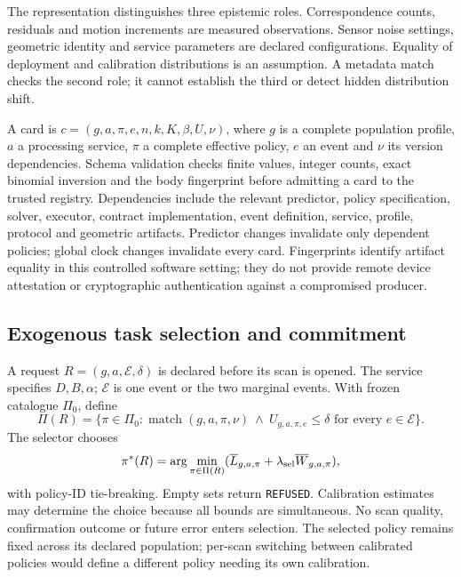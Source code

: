 The representation distinguishes three epistemic roles. Correspondence counts, residuals and motion increments are measured observations. Sensor noise settings, geometric identity and service parameters are declared configurations. Equality of deployment and calibration distributions is an assumption. A metadata match checks the second role; it cannot establish the third or detect hidden distribution shift.

A card is $c=(g,a,\pi,e,n,k,K,\beta,U,\nu)$, where $g$ is a complete population profile, $a$ a processing service, $\pi$ a complete effective policy, $e$ an event and $\nu$ its version dependencies. Schema validation checks finite values, integer counts, exact binomial inversion and the body fingerprint before admitting a card to the trusted registry. Dependencies include the relevant predictor, policy specification, solver, executor, contract implementation, event definition, service, profile, protocol and geometric artifacts. Predictor changes invalidate only dependent policies; global clock changes invalidate every card. Fingerprints identify artifact equality in this controlled software setting; they do not provide remote device attestation or cryptographic authentication against a compromised producer.

\subsection{Exogenous task selection and commitment}\label{sec:dispatch}
A request $R=(g,a,\mathcal E,\delta)$ is declared before its scan is opened. The service specifies $D,B,\alpha$; $\mathcal E$ is one event or the two marginal events. With frozen catalogue $\Pi_0$, define
\begin{equation}
\Pi(R)=\{\pi\in\Pi_0:\operatorname{match}(g,a,\pi,\nu)\ \land\ U_{g,a,\pi,e}\le\delta\text{ for every }e\in\mathcal E\}.\label{eq:dispatch-set}
\end{equation}
The selector chooses
\begin{equation}
\pi^*(R)=\arg\min_{\pi\in\Pi(R)}(\overline L_{g,a,\pi}+\lambda_{\rm sel}\overline W_{g,a,\pi}),\label{eq:dispatch-choice}
\end{equation}
with policy-ID tie-breaking. Empty sets return \texttt{REFUSED}. Calibration estimates may determine the choice because all bounds are simultaneous. No scan quality, confirmation outcome or future error enters selection. The selected policy remains fixed across its declared population; per-scan switching between calibrated policies would define a different policy needing its own calibration.

